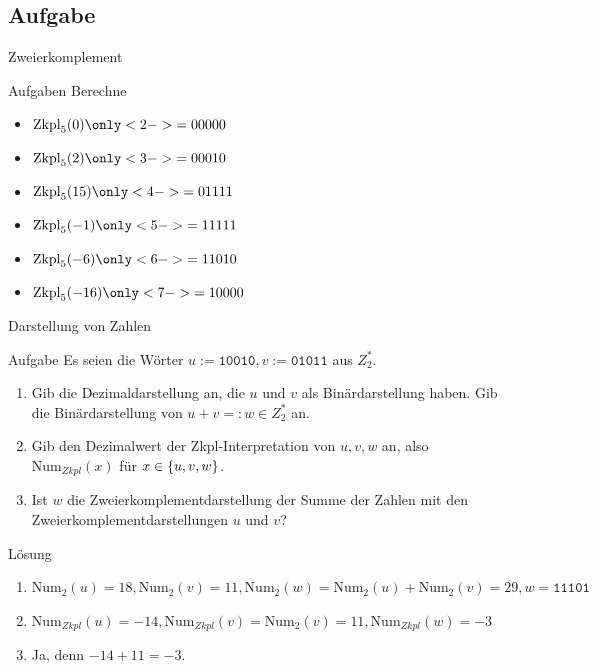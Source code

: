 \subsection{Aufgabe}
\begin{frame}{Zweierkomplement}
	\begin{exampleblock}{Aufgaben}
	Berechne
		\begin{itemize}
			\item $\text{Zkpl}_5(0) \only<2->{= 00000}$ \\
			\item $\text{Zkpl}_5(2) \only<3->{= 00010}$ \\
			\item $\text{Zkpl}_5(15) \only<4->{= 01111}$ \\
			\item $\text{Zkpl}_5(-1) \only<5->{= 11111} $\\
			\item $\text{Zkpl}_5(-6) \only<6->{= 11010} $\\
			\item $\text{Zkpl}_5(-16) \only<7->{= 10000}$
		\end{itemize}
	\end{exampleblock}
\end{frame}

\begin{frame}{Darstellung von Zahlen}
    \begin{exampleblock}{Aufgabe}
    	Es seien die Wörter $u := \texttt{10010}, v := \texttt{01011}$ aus $Z_2^*$.
    	\begin{enumerate}
     		\item Gib die Dezimaldarstellung an, die $u$ und $v$ als Binärdarstellung haben. Gib die Binärdarstellung von $u+v=:w \in Z_2^*$ an.
    		\item Gib den Dezimalwert der Zkpl-Interpretation von $u, v, w$ an, also $\text{Num}_{Zkpl}(x)$ für $x\in \left\{ u,v,w \right\}$.
    		\item Ist $w$ die Zweierkomplementdarstellung der Summe der Zahlen mit den Zweierkomplementdarstellungen $u$ und $v$?
  		\end{enumerate}
    \end{exampleblock}
\end{frame}
	
\begin{frame}
    \begin{block}{Lösung}
    	\begin{enumerate}
     		\item $\text{Num}_2(u)=18, \text{Num}_2(v)=11, \text{Num}_2(w) = \text{Num}_2(u)+\text{Num}_2(v)=29, w=\texttt{11101}$
    		\pause \item $\text{Num}_{Zkpl}(u)=-14, \text{Num}_{Zkpl}(v)=\text{Num}_2(v)=11, \text{Num}_{Zkpl}(w)=-3$
    		\pause \item Ja, denn $-14+11=-3$.
  		\end{enumerate}
    \end{block}
\end{frame}



